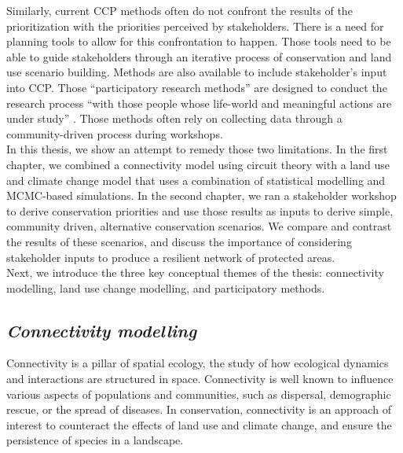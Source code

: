 \documentclass[12pt,Bold,TexShade]{thesis/mcgilletdclass}
\begin{document}
{Similarly, current CCP methods often do not confront the results of the prioritization with the priorities perceived by stakeholders. There is a need for planning tools to allow for this confrontation to happen. Those tools need to be able to guide stakeholders through an iterative process of conservation and land use scenario building. Methods are also available to include stakeholder’s input into CCP. Those “participatory research methods” are designed to conduct the research process “with those people whose life-world and meaningful actions are under study” \citep{bergold_participatory_2012}. Those methods often rely on collecting data through a community-driven process during workshops. \\

In this thesis, we show an attempt to remedy those two limitations. In the first chapter, we combined a connectivity model using circuit theory with a land use and climate change model that uses a combination of statistical modelling and MCMC-based simulations. In the second chapter, we ran a stakeholder workshop to derive conservation priorities and use those results as inputs to derive simple, community driven, alternative conservation scenarios. We compare and contrast the results of these scenarios, and discuss the importance of considering stakeholder inputs to produce a resilient network of protected areas. \\

Next, we introduce the three key conceptual themes of the thesis: connectivity modelling, land use change modelling, and participatory methods. \\ \vspace{2em}

\subsection*{\textit{Connectivity modelling \\ \vspace{1em}}}

Connectivity is a pillar of spatial ecology, the study of how ecological dynamics and interactions are structured in space. Connectivity is well known to influence various aspects of populations and communities, such as dispersal, demographic rescue, or the spread of diseases. In conservation, connectivity is an approach of interest to counteract the effects of  land use and climate change, and ensure the persistence of species in a landscape. \\

}
\end{document}
